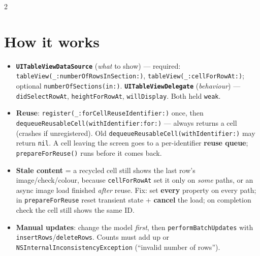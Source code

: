 \documentclass[8pt]{extarticle}
\begin{document}



\begin{multicols}{2}
\raggedright

\section{How it works}
\begin{itemize}
  \item \textbf{\texttt{UITableViewDataSource}} (\emph{what} to show) — required:
        \texttt{tableView(\_:numberOfRowsInSection:)}, \texttt{tableView(\_:cellForRowAt:)};
        optional \texttt{numberOfSections(in:)}. \textbf{\texttt{UITableViewDelegate}}
        (\emph{behaviour}) — \texttt{didSelectRowAt}, \texttt{heightForRowAt}, \texttt{willDisplay}.
        Both held \texttt{weak}.
  \item \textbf{Reuse}: \texttt{register(\_:forCellReuseIdentifier:)} once, then
        \texttt{dequeueReusableCell(withIdentifier:for:)} — always returns a cell (crashes if
        unregistered). Old \texttt{dequeueReusableCell(withIdentifier:)} may return \texttt{nil}.
        A cell leaving the screen goes to a per-identifier \textbf{reuse queue}; \sloppy
        \texttt{prepareForReuse()} runs before it comes back.
  \item \textbf{Stale content} = a recycled cell still shows the last row's image/check/colour,
        because \texttt{cellForRowAt} set it only on \emph{some} paths, or an async image load
        finished \emph{after} reuse. Fix: set \textbf{every} property on every path; in
        \texttt{prepareForReuse} reset transient state + \textbf{cancel} the load; on completion
        check the cell still shows the same ID.
  \item \textbf{Manual updates}: change the model \emph{first}, then \texttt{performBatchUpdates}
        with \texttt{insertRows}/\texttt{deleteRows}. Counts must add up or
        \texttt{NSInternalInconsistencyException} (``invalid number of rows'').

\end{itemize}
\end{multicols}
\end{document}
